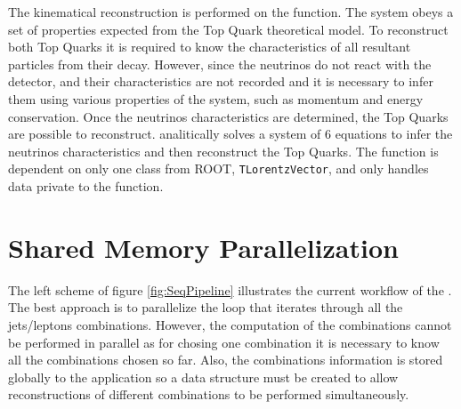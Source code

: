 The kinematical reconstruction is performed on the \dilep function. The \ttbar system obeys a set of properties expected from the Top Quark theoretical model. To reconstruct both Top Quarks it is required to know the characteristics of all resultant particles from their decay. However, since the neutrinos do not react with the detector, and their characteristics are not recorded and it is necessary to infer them using various properties of the system, such as momentum and energy conservation. Once the neutrinos characteristics are determined, the Top Quarks are possible to reconstruct. \dilep analitically solves a system of 6 equations to infer the neutrinos characteristics and then reconstruct the Top Quarks. The function is dependent on only one class from ROOT, \texttt{TLorentzVector}, and only handles data private to the function.

\section{Shared Memory Parallelization}
\label{Parallelization:SharedMem}

The left scheme of figure \ref{fig:SeqPipeline} illustrates the current workflow of the \ttDilepKinFit. The best approach is to parallelize the loop that iterates through all the jets/leptons combinations. However, the computation of the combinations cannot be performed in parallel as for chosing one combination it is necessary to know all the combinations chosen so far. Also, the combinations information is stored globally to the application so a data structure must be created to allow reconstructions of different combinations to be performed simultaneously.


